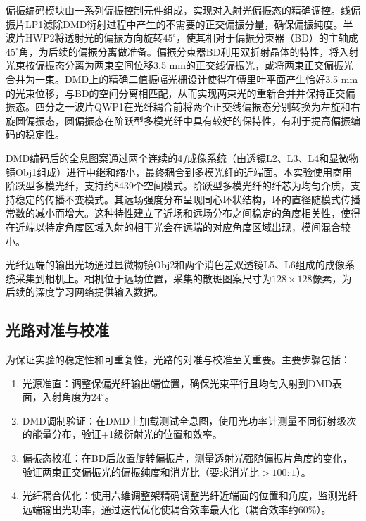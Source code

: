 {偏振编码模块由一系列偏振控制元件组成，实现对入射光偏振态的精确调控。线偏振片LP1滤除DMD衍射过程中产生的不需要的正交偏振分量，确保偏振纯度。半波片HWP2将透射光的偏振方向旋转$45^\circ$，使其相对于偏振分束器（BD）的主轴成$45^\circ$角，为后续的偏振分离做准备。偏振分束器BD利用双折射晶体的特性，将入射光束按偏振态分离为两束空间位移3.5 mm的正交线偏振光，或将两束正交偏振光合并为一束。DMD上的精确二值振幅光栅设计使得在傅里叶平面产生恰好3.5 mm的光束位移，与BD的空间分离相匹配，从而实现两束光的重新合并并保持正交偏振态。四分之一波片QWP1在光纤耦合前将两个正交线偏振态分别转换为左旋和右旋圆偏振态，圆偏振态在阶跃型多模光纤中具有较好的保持性，有利于提高偏振编码的稳定性。

DMD编码后的全息图案通过两个连续的4$f$成像系统（由透镜L2、L3、L4和显微物镜Obj1组成）进行中继和缩小，最终耦合到多模光纤的近端面。本实验使用商用阶跃型多模光纤，支持约8439个空间模式。阶跃型多模光纤的纤芯为均匀介质，支持稳定的传播不变模式。其远场强度分布呈现同心环状结构，环的直径随模式传播常数的减小而增大。这种特性建立了近场和远场分布之间稳定的角度相关性，使得在近端以特定角度区域入射的相干光会在远端的对应角度区域出现，模间混合较小。

光纤远端的输出光场通过显微物镜Obj2和两个消色差双透镜L5、L6组成的成像系统采集到相机上。相机位于远场位置，采集的散斑图案尺寸为$128\times128$像素，为后续的深度学习网络提供输入数据。

\subsection{光路对准与校准}\label{sec:alignment}

为保证实验的稳定性和可重复性，光路的对准与校准至关重要。主要步骤包括：
\begin{enumerate}
    \item 光源准直：调整保偏光纤输出端位置，确保光束平行且均匀入射到DMD表面，入射角度为$24^\circ$。
    
    \item DMD调制验证：在DMD上加载测试全息图，使用光功率计测量不同衍射级次的能量分布，验证+1级衍射光的位置和效率。
    
    \item 偏振态校准：在BD后放置旋转偏振片，测量透射光强随偏振片角度的变化，验证两束正交偏振光的偏振纯度和消光比（要求消光比$>100:1$）。
    
    \item 光纤耦合优化：使用六维调整架精确调整光纤近端面的位置和角度，监测光纤远端输出光功率，通过迭代优化使耦合效率最大化（耦合效率约60\%）。
    

\end{enumerate}}
